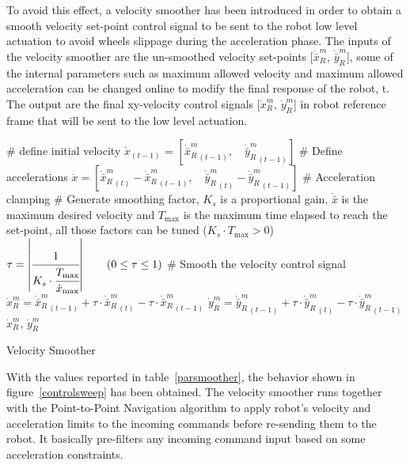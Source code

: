 To avoid this effect, a velocity smoother has been introduced in order to obtain a smooth velocity set-point control signal to be sent to the robot low level actuation to avoid wheels slippage during the  acceleration phase. The inputs of the velocity smoother are the un-smoothed velocity set-points [$\dot{\bar{x}}_R^m$, $\dot{\bar{y}}_R^m$], some of the internal parameters such as maximum allowed velocity and maximum allowed acceleration can be changed online to modify the final response of the robot, t. The output are the final xy-velocity control signals [$\dot{x}_R^m$, $\dot{y}_R^m$] in robot reference frame that will be sent to the low level actuation.

\begin{algorithm}[h]
	\# define initial velocity\;
	$\dot{x}_{(t-1)}$ = $\left[{\dot{\bar{x}}_R^m}_{(t-1)},\quad {\dot{\bar{y}}_R^m}_{(t-1)}\right]$\;
	\# Define accelerations\;
	$\ddot{x}= \left[ {\dot{\bar{x}}_R^m}_{(t)}-{\dot{\bar{x}}_R^m}_{(t-1)},\quad {\dot{\bar{y}}_R^m}_{(t)}-{\dot{\bar{y}}_R^m}_{(t-1)}\right]$\;
	\# Acceleration clamping \;
	\# Generate smoothing factor, $K_s$ is a proportional gain, $\dot{\bar{x}}$ is the maximum desired velocity and $T_\text{max}$ is the maximum time elapsed to reach the set-point, all those factors can be tuned ($K_s\cdot T_\text{max} > 0 $)\;
	$\tau = \left| \cfrac{1}{K_s\cdot\cfrac{T_\text{max}}{\dot{x}_{\text{max}}}}\right|\qquad(0\leq\tau\leq1)$\;
	\# Smooth the velocity control signal\;
	${\dot{x}_R^m} = {\dot{\bar{x}}_R^m}_{(t-1)}+\tau\cdot{\dot{\bar{x}}_R^m}_{(t)}-\tau\cdot{\dot{\bar{x}}_R^m}_{(t-1)}$ \;
	${\dot{y}_R^m} = {\dot{\bar{y}}_R^m}_{(t-1)}+\tau\cdot{\dot{\bar{y}}_R^m}_{(t)}-\tau\cdot{\dot{\bar{y}}_R^m}_{(t-1)}$ \;
	\Return $\dot{x}_R^m$, $\dot{y}_R^m$
	\caption{Velocity Smoother} 
	\label{smoother}
\end{algorithm}

With the values reported in table~\ref{parsmoother}, the behavior shown in figure~\ref{controlsweep} has been obtained. The velocity smoother runs together with the Point-to-Point Navigation algorithm to apply robot's velocity and acceleration limits to the incoming commands before re-sending them to the robot. It basically pre-filters any incoming command input based on some acceleration constraints. 

